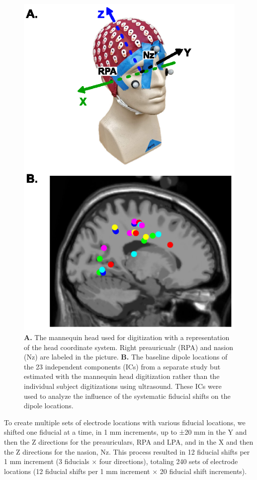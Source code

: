 \documentclass{UCF_ETD}
\begin{document}
\begin{figure}[bt]
      \centering
      \includegraphics[scale=1.0]{img/fig0.eps}
      \caption{\textbf{A.} The mannequin head used for digitization with a representation of the head coordinate system. Right preauricualr (RPA) and nasion (Nz) are labeled in the picture. \textbf{B.} The baseline dipole locations of the 23 independent components (ICs) from a separate study but estimated with the mannequin head digitization rather than the individual subject digitizations using ultrasound. These ICs were used to analyze the influence of the systematic fiducial shifts on the dipole locations.}
      \label{fig:coor}
\end{figure}

To create multiple sets of electrode locations with various fiducial locations, we shifted one fiducial at a time, in 1 mm increments, up to ±20 mm in the Y and then the Z directions for the preauriculars, RPA and LPA, and in the X and then the Z directions for the nasion, Nz. This process resulted in 12 fiducial shifts per 1 mm increment (3 fiducials $\times$ four directions), totaling 240 sets of electrode locations (12 fiducial shifts per 1 mm increment $\times$ 20 fiducial shift increments).
\end{document}
